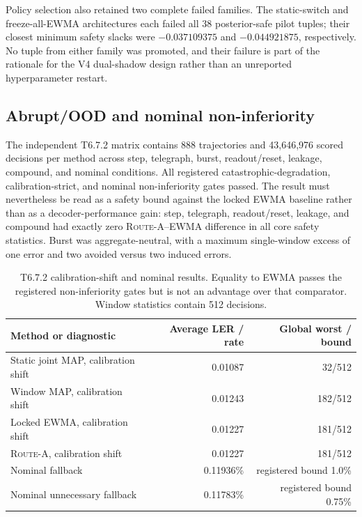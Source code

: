 \documentclass[11pt]{article}
\newcommand{\RouteA}{\textsc{Route-A}}
\begin{document}
Policy selection also retained two complete failed families.  The static-switch
and freeze-all-EWMA architectures each failed all 38 posterior-safe pilot
tuples; their closest minimum safety slacks were $-0.037109375$ and
$-0.044921875$, respectively.  No tuple from either family was promoted, and
their failure is part of the rationale for the V4 dual-shadow design rather
than an unreported hyperparameter restart.

\subsection{Abrupt/OOD and nominal non-inferiority}

The independent T6.7.2 matrix contains 888 trajectories and 43,646,976 scored
decisions per method across step, telegraph, burst, readout/reset, leakage,
compound, and nominal conditions.  All registered catastrophic-degradation,
calibration-strict, and nominal non-inferiority gates passed.  The result must
nevertheless be read as a safety bound against the locked EWMA baseline rather
than as a decoder-performance gain: step, telegraph, readout/reset, leakage,
and compound had exactly zero \RouteA{}--EWMA difference in all core safety
statistics.  Burst was aggregate-neutral, with a maximum single-window excess
of one error and two avoided versus two induced errors.

\begin{table}[htbp]
\centering
\small
\caption{T6.7.2 calibration-shift and nominal results.  Equality to EWMA passes
the registered non-inferiority gates but is not an advantage over that
comparator.  Window statistics contain 512 decisions.}
\label{tab:tail-formal}
\begin{tabular}{@{}l r r@{}}
\toprule
Method or diagnostic & Average LER / rate & Global worst / bound \\
\midrule
Static joint MAP, calibration shift & 0.01087 & 32/512 \\
Window MAP, calibration shift & 0.01243 & 182/512 \\
Locked EWMA, calibration shift & 0.01227 & 181/512 \\
\RouteA{}, calibration shift & 0.01227 & 181/512 \\
Nominal fallback & 0.11936\% & registered bound 1.0\% \\
Nominal unnecessary fallback & 0.11783\% & registered bound 0.75\% \\
\bottomrule
\end{tabular}
\end{table}
\end{document}
